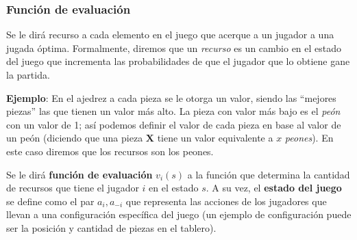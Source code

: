 \subsubsection{Función de evaluación}
  \begin{definition}
    Se le dirá recurso a cada elemento en el juego que acerque a un jugador a una jugada óptima.
    Formalmente, diremos que un \textit{recurso} es un cambio en el estado del juego que incrementa
    las probabilidades de que el jugador que lo obtiene gane la partida.

    \textbf{Ejemplo}: En el ajedrez a cada pieza se le otorga un valor, siendo las \enquote{mejores 
    piezas} las que tienen un valor más alto.
    La pieza con valor más bajo es el \textit{peón} con un valor de 1; así podemos definir el valor
    de cada pieza en base al valor de un peón (diciendo que una pieza \(\mathbf{X}\) tiene un valor
    equivalente a \(x\) \textit{peones}).
    En este caso diremos que los recursos son los peones.
  \end{definition}

  Se le dirá \textbf{función de evaluación}\cite{EvaluationFunction2022} \(v_i(s)\) a la función 
  que determina la cantidad de recursos que tiene el jugador \(i\) en el estado \(s\).
  A su vez, el \textbf{estado del juego} se define como el par \(a_i, a_{-i}\) que representa las
  acciones de los jugadores que llevan a una configuración específica del juego (un ejemplo de
  configuración puede ser la posición y cantidad de piezas en el tablero).